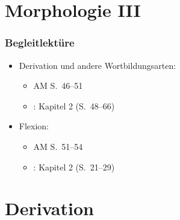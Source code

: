 
\nocite{Eisenberg00a}
\nocite{Fleischer00a} %
\nocite{Fleischer&Barz12a} %
\nocite{Fries&MyP16j} %
\nocite{Grewendorf&Co91a} %
\nocite{Haspelmath2002a}
\nocite{MyP18b} %
\nocite{Olsen86a} %


\section{Morphologie III}

\begin{frame}
\frametitle{Begleitlektüre}

\begin{itemize}
	\item Derivation und andere Wortbildungsarten:
\begin{itemize}
		\item AM S.~46--51
	\item \citet{Meibauer&Co07a}: Kapitel 2 (S.~48--66)
\end{itemize}
	\item Flexion:
\begin{itemize}
		\item AM S.~51--54
	\item  \citet{Meibauer&Co07a}: Kapitel 2 (S.~21--29)
\end{itemize}
\end{itemize}

\end{frame}


\section{Derivation}


